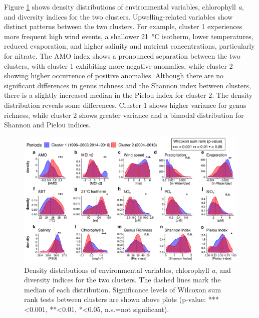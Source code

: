 \documentclass[draft]{agujournal2019}
\begin{document}
Figure \ref{fig:clustcomp} shows density distributions of environmental variables, chlorophyll \textit{a}, and diversity indices for the two clusters. Upwelling-related variables show distinct patterns between the two clusters. For example, cluster 1 experiences more frequent high wind events, a shallower \qty{21}{\celsius} isotherm, lower temperatures, reduced evaporation, and higher salinity and nutrient concentrations, particularly for nitrate. The AMO index shows a pronounced separation between the two clusters, with cluster 1 exhibiting more negative anomalies, while cluster 2 showing higher occurrence of positive anomalies. Although there are no significant differences in genus richness and the Shannon index between clusters, there is a slightly increased median in the Pielou index for cluster 2. The density distribution reveals some differences. Cluster 1 shows higher variance for genus richness, while cluster 2  shows greater variance and a bimodal distribution for Shannon and Pielou indices. 

\begin{figure}
\noindent\includegraphics[width=\textwidth]{fig/Figure5_ClustCompPlot_v2.pdf}
\caption{Density distributions of environmental variables, chlorophyll \textit{a}, and diversity indices for the two clusters. The dashed lines mark the median of each distribution. Significance levels of Wilcoxon sum rank tests between clusters are shown above plots  (p-value: ***\textless0.001, **\textless0.01, *\textless0.05, n.s.=not significant).}
\label{fig:clustcomp}
\end{figure}
\end{document}
